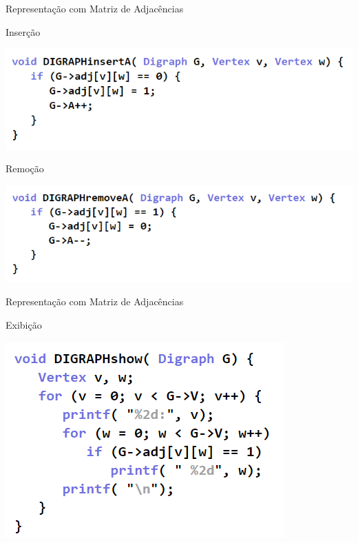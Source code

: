 \documentclass[xcolor=dvipsnames,table]{beamer}
\begin{document}
	\begin{frame}{Representação com Matriz de Adjacências}
		\begin{block}{Inserção}
			\begin{center}
	    		\includegraphics[height=.3\textheight]{images/digraph-insert-a.png}
	  		\end{center}
		\end{block} \pause
		\begin{block}{Remoção}
			\begin{center}
	    		\includegraphics[height=.3\textheight]{images/digraph-remove-a.png}
	  		\end{center}
		\end{block}
	\end{frame}	
	
	\begin{frame}{Representação com Matriz de Adjacências}
		\begin{block}{Exibição}
			\begin{center}
	    		\includegraphics[height=.5\textheight]{images/digraph-show.png}
	  		\end{center}
		\end{block}
	\end{frame}
	
\end{document}
